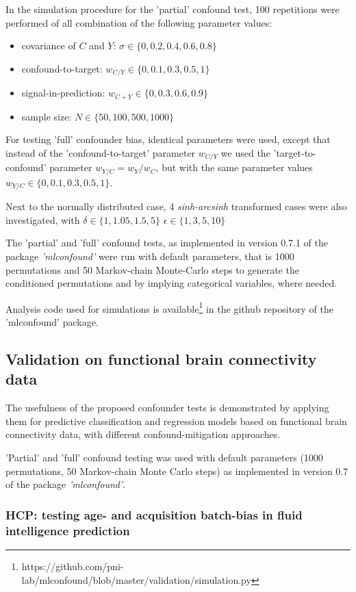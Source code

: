 \documentclass{article}
\begin{document}
In the simulation procedure for the 'partial' confound test, 100 repetitions were performed of all combination of the following parameter values: 
\begin{itemize}
    \item covariance of $C$ and $Y$: $\sigma \in \{0, 0.2, 0.4, 0.6, 0.8\}$
    \item confound-to-target: $w_{C/Y} \in \{0, 0.1, 0.3, 0.5, 1\}$
    \item signal-in-prediction: $w_{C+Y} \in \{0, 0.3, 0.6, 0.9\}$
    \item sample size: $N \in \{50, 100, 500, 1000\}$
\end{itemize}

For testing 'full' confounder bias, identical parameters were used, except that instead of the 'confound-to-target' parameter $ w_{C/Y}$ we used the 'target-to-confound' parameter $ w_{Y/C} = w_Y / w_C $, but with the same parameter values $w_{Y/C} \in \{0, 0.1, 0.3, 0.5, 1\}$.

Next to the normally distributed case, 4 \emph{sinh-arcsinh} transformed cases were also investigated, with $\delta \in \{1, 1.05, 1.5, 5\}$ $\epsilon \in \{1, 3, 5, 10\}$ 

The 'partial' and 'full' confound tests, as implemented in version 0.7.1 of the package \emph{'mlconfound'} were run with default parameters, that is 1000 permutations and 50 Markov-chain Monte-Carlo steps to generate the conditioned permutations and by implying categorical variables, where needed.

Analysis code used for simulations is available\footnote{https://github.com/pni-lab/mlconfound/blob/master/validation/simulation.py} in the github repository of the 'mlconfound' package.

\subsection{Validation on functional brain connectivity data}

The usefulness of the proposed confounder tests is demonstrated by applying them for predictive classification and regression models based on functional brain connectivity data, with different confound-mitigation approaches. 

'Partial' and 'full' confound testing was used with default parameters (1000 permutations, 50 Markov-chain Monte Carlo steps) as implemented in version 0.7 of the package \emph{'mlconfound'}.

\subsubsection*{HCP: testing age- and acquisition batch-bias in fluid intelligence prediction}
\end{document}
